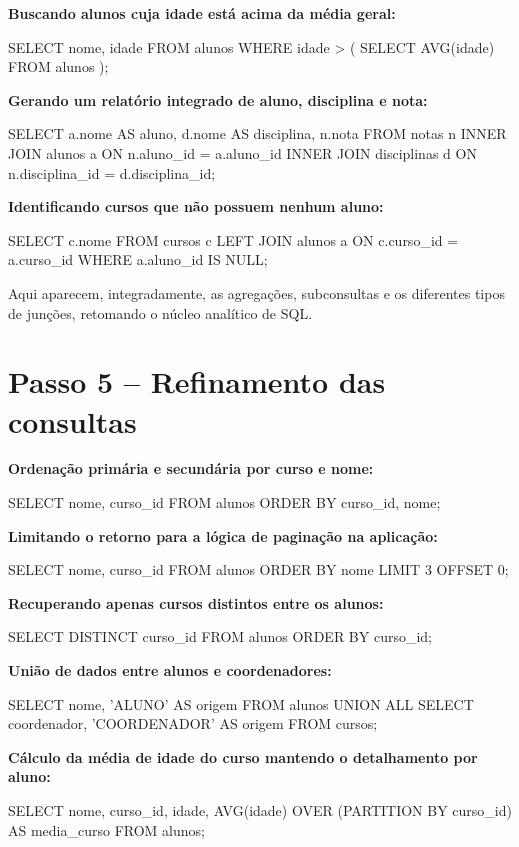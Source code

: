 \textbf{Buscando alunos cuja idade está acima da média geral:}
\begin{sqlcode}
SELECT nome, idade
FROM alunos
WHERE idade > (
    SELECT AVG(idade)
    FROM alunos
);
\end{sqlcode}

\textbf{Gerando um relatório integrado de aluno, disciplina e nota:}
\begin{sqlcode}
SELECT a.nome AS aluno,
       d.nome AS disciplina,
       n.nota
FROM notas n
INNER JOIN alunos a
    ON n.aluno_id = a.aluno_id
INNER JOIN disciplinas d
    ON n.disciplina_id = d.disciplina_id;
\end{sqlcode}

\textbf{Identificando cursos que não possuem nenhum aluno:}
\begin{sqlcode}
SELECT c.nome
FROM cursos c
LEFT JOIN alunos a
    ON c.curso_id = a.curso_id
WHERE a.aluno_id IS NULL;
\end{sqlcode}

Aqui aparecem, integradamente, as agregações, subconsultas e os diferentes tipos de junções, retomando o núcleo analítico de SQL.

\section{Passo 5 -- Refinamento das consultas}

\textbf{Ordenação primária e secundária por curso e nome:}
\begin{sqlcode}
SELECT nome, curso_id
FROM alunos
ORDER BY curso_id, nome;
\end{sqlcode}

\textbf{Limitando o retorno para a lógica de paginação na aplicação:}
\begin{sqlcode}
SELECT nome, curso_id
FROM alunos
ORDER BY nome
LIMIT 3 OFFSET 0;
\end{sqlcode}

\textbf{Recuperando apenas cursos distintos entre os alunos:}
\begin{sqlcode}
SELECT DISTINCT curso_id
FROM alunos
ORDER BY curso_id;
\end{sqlcode}

\textbf{União de dados entre alunos e coordenadores:}
\begin{sqlcode}
SELECT nome, 'ALUNO' AS origem
FROM alunos
UNION ALL
SELECT coordenador, 'COORDENADOR' AS origem
FROM cursos;
\end{sqlcode}

\textbf{Cálculo da média de idade do curso mantendo o detalhamento por aluno:}
\begin{sqlcode}
SELECT
    nome,
    curso_id,
    idade,
    AVG(idade) OVER (PARTITION BY curso_id) AS media_curso
FROM alunos;
\end{sqlcode}

